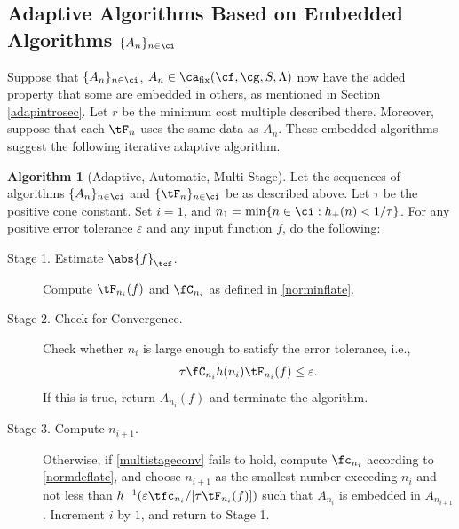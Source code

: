 \documentclass[]{elsarticle}
\DeclareMathOperator{\fix}{fix}
\theoremstyle{definition}
\newtheorem{algo}{Algorithm}
\theoremstyle{remark}
\newcommand{\Ftnorm}[1]{\abs{#1}_{\tcf}}
\begin{document}
\subsection{Adaptive Algorithms Based on Embedded Algorithms $\{A_n\}_{n \in \ci}$}

Suppose that $\{A_n\}_{n \in \ci}$, $A_n  \in \ca_{\fix}(\cf,\cg,S,\Lambda)$ now have the added property that some are embedded in others, as mentioned in Section \ref{adapintrosec}.  Let $r$ be the minimum cost multiple described there.  Moreover, suppose that each $\tF_n$ uses the same data as $A_n$. These embedded algorithms suggest the following iterative adaptive algorithm.

\begin{algo}[Adaptive, Automatic, Multi-Stage] \label{multistagealgo}  Let the sequences of algorithms $\{A_n\}_{n \in \ci}$ and  $\{\tF_n\}_{n \in \ci}$ be as described above.  Let $\tau$ be the positive cone constant. Set $i=1$, and $n_1 = \min\{ n \in \ci : h_+(n) < 1/\tau\}$. For any positive error tolerance $\varepsilon$ and any input function $f$, do the following:
\begin{description}

\item [Stage 1. Estimate $\Ftnorm{f}$.] Compute $\tF_{n_i}(f)$ and $\fC_{n_i}$ as defined in \eqref{norminflate}.  

\item [Stage 2. Check for Convergence.] Check whether $n_i$ is large enough to satisfy the error tolerance, i.e., 
\begin{equation} \label{multistageconv}
\tau \fC_{n_i} h(n_i)\tF_{n_i}(f) \le \varepsilon.
\end{equation}
If this is true, return $A_{n_i}(f)$ and terminate the algorithm.

\item[Stage 3. Compute $n_{i+1}$.]  Otherwise, if \eqref{multistageconv} fails to hold, compute $\fc_{n_i}$ according to \eqref{normdeflate}, and choose $n_{i+1}$ as the smallest number exceeding $n_i$ and not less than $h^{-1}(\varepsilon \tfc_{n_i}/[\tau \tF_{n_i}(f)])$ such that $A_{n_{i}}$ is embedded in $A_{n_{i+1}}$. Increment $i$ by $1$, and return to Stage 1.  

\end{description}  
\end{algo}
\end{document}

